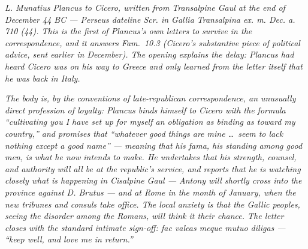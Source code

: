 
\textit{L. Munatius Plancus to Cicero, written from
Transalpine Gaul at the end of December 44 BC --- Perseus
dateline \textit{Scr. in Gallia Transalpina ex. m. Dec.
a. 710 (44)}. This is the first of Plancus's own letters
to survive in the correspondence, and it answers
\textit{Fam.}\ 10.3 (Cicero's substantive piece of
political advice, sent earlier in December). The opening
explains the delay: Plancus had heard Cicero was on his
way to Greece and only learned from the letter itself
that he was back in Italy.}

\textit{The body is, by the conventions of late-republican
correspondence, an unusually direct profession of loyalty:
Plancus binds himself to Cicero with the formula
``cultivating you I have set up for myself an obligation
as binding as toward my country,'' and promises that
``whatever good things are mine \dots\ seem to lack
nothing except a good name'' --- meaning that his
\textit{fama}, his standing among good men, is what he
now intends to make. He undertakes that his strength,
counsel, and authority will all be at the republic's
service, and reports that he is watching closely what is
happening in Cisalpine Gaul --- Antony will shortly cross
into the province against D. Brutus --- and at Rome in
the month of January, when the new tribunes and consuls
take office. The local anxiety is that the Gallic peoples,
seeing the disorder among the Romans, will think it their
chance. The letter closes with the standard intimate
sign-off: \textit{fac valeas meque mutuo diligas} ---
``keep well, and love me in return.''}
